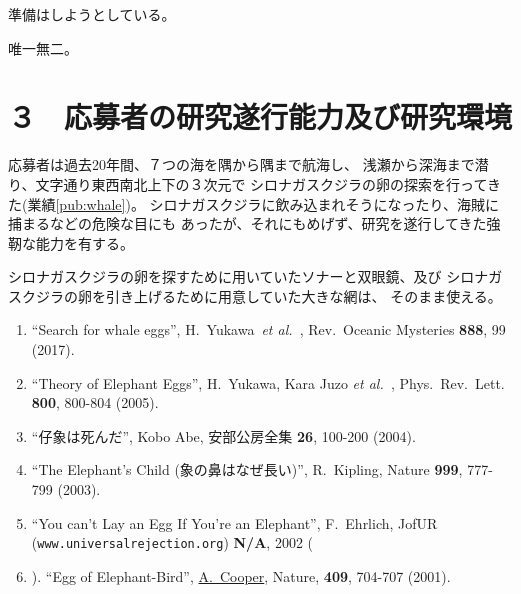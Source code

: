 \documentclass[11pt,a4j,dvipdfmx]{jarticle} 					%
\newcommand{\研究課題名}{象の卵}
\newcommand{\研究機関名}{逢坂大学}
\newcommand{\研究代表者氏名}{湯川秀樹}
\newcommand{\paper}[6]{%
	\item ``#1'', #2, #3 {\bf #4}, #5 (#6).			%
}
\newcommand{\etal}{\textit{et al.\ }}
\newcommand{\yukawa}{H.~Yukawa}					%
\newcommand{\prl}{Phys.\ Rev.\ Lett.\ }		%
\begin{document}
	準備はしようとしている。

	唯一無二。




\section{３　応募者の研究遂行能力及び研究環境}

\PapersInstructions	%

	応募者は過去20年間、７つの海を隅から隅まで航海し、
	浅瀬から深海まで潜り、文字通り東西南北上下の３次元で
	シロナガスクジラの卵の探索を行ってきた(業績\ref{pub:whale})。
	シロナガスクジラに飲み込まれそうになったり、海賊に捕まるなどの危険な目にも
	あったが、それにもめげず、研究を遂行してきた強靭な能力を有する。

	シロナガスクジラの卵を探すために用いていたソナーと双眼鏡、及び
	シロナガスクジラの卵を引き上げるために用意していた大きな網は、
	そのまま使える。
	\begin{enumerate}
		\paper{Search for whale eggs}{\yukawa\ \etal}{Rev.\ Oceanic Mysteries}{888}{99}{2017}
			\label{pub:whale}
				
		\paper{Theory of Elephant Eggs}{\yukawa, Kara Juzo \etal}{\prl}{800}{800-804}{2005}
			\label{pub:theoegg}
				
		\paper{仔象は死んだ}{Kobo Abe}{安部公房全集}{26}{100-200}{2004}
		
		\paper{The Elephant's Child (象の鼻はなぜ長い)}{R.~Kipling}{Nature}{999}{777-799}{2003}

		\paper{You can't Lay an Egg If You're an Elephant}{F.~Ehrlich}
			{JofUR\\({\tt www.universalrejection.org})}{{\bf N/A}}{2002}
		
		\item ``Egg of Elephant-Bird'', 
				\underline{A.~Cooper},
				Nature, {\bf 409}, 704-707 (2001).	%
	\end{enumerate}
\end{document}
